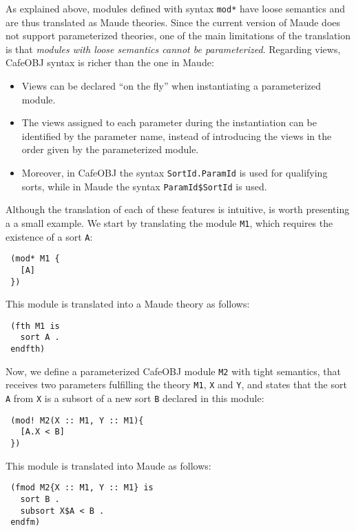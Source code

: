 As explained above, modules defined with syntax \verb"mod*"
have loose semantics and are thus translated as Maude theories. Since the current
version of Maude does not support parameterized theories, one of the main
limitations of the translation is that \emph{modules with loose semantics cannot
be parameterized}.
%
Regarding views, CafeOBJ syntax is richer than the one in Maude:
\begin{itemize}
\item
Views can be declared ``on the fly'' when instantiating a parameterized module.

\item
The views assigned to each parameter during the instantiation can be identified by the
parameter name, instead of introducing the views in the order given by the parameterized
module.

\item
Moreover, in CafeOBJ the syntax \verb"SortId.ParamId" is used for qualifying sorts, while in Maude
the syntax \verb"ParamId$SortId" is used.

\end{itemize}

Although the translation of each of these features is intuitive, is worth presenting a 
a small example. We start by translating the module \verb"M1", which requires
the existence of a sort \verb"A":

{\codesize
\begin{verbatim}
 (mod* M1 {
   [A]
 })
\end{verbatim}
}

This module is translated into a Maude theory as follows:

{\codesize
\begin{verbatim}
 (fth M1 is
   sort A .
 endfth)
\end{verbatim}
}

Now, we define a parameterized CafeOBJ module \verb"M2" with tight semantics, that receives
two parameters fulfilling the theory \verb"M1", \verb"X" and \verb"Y", and states that the sort
\verb"A" from \verb"X" is a subsort of a new sort \verb"B" declared in this module:

{\codesize
\begin{verbatim}
 (mod! M2(X :: M1, Y :: M1){
   [A.X < B]
 })
\end{verbatim}
}

This module is translated into Maude as follows:

{\codesize
\begin{verbatim}
 (fmod M2{X :: M1, Y :: M1} is
   sort B .
   subsort X$A < B .
 endfm)
\end{verbatim}
}


